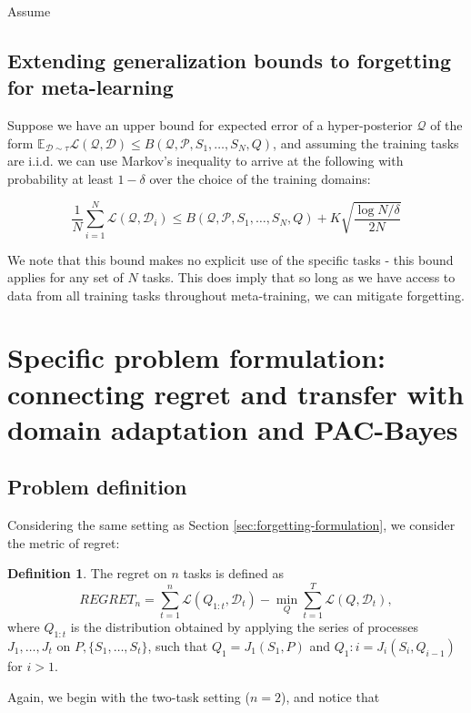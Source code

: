 \documentclass[letterpaper]{article}
\theoremstyle{definition}
\newtheorem{defn}{Definition}[section]
\begin{document}
Assume 

\subsection{Extending generalization bounds to forgetting for meta-learning}

Suppose we have an upper bound for expected error of a hyper-posterior $\mathcal{Q}$ of the form $\mathbb{E}_{\mathcal{D}\sim \tau}\mathcal{L}(\mathcal{Q}, \mathcal{D})\leq B(\mathcal{Q},\mathcal{P}, S_1,\ldots, S_N, Q)$, and assuming the training tasks are i.\!i.\!d. we can use Markov's inequality to arrive at the following with probability at least $1-\delta$ over the choice of the training domains:

\begin{equation}
\frac{1}{N}\sum_{i=1}^{N}\mathcal{L}(\mathcal{Q}, \mathcal{D}_i) \leq B(\mathcal{Q},\mathcal{P}, S_1,\ldots, S_N, Q) + K\sqrt{\frac{\log N/\delta}{2N}}
\end{equation}

We note that this bound makes no explicit use of the specific tasks - this bound applies for any set of $N$ tasks. This does imply that so long as we have access to data from all training tasks throughout meta-training, we can mitigate forgetting.

\section{Specific problem formulation: connecting regret and transfer with domain adaptation and PAC-Bayes}

\subsection{Problem definition} \label{sec:regret-formulation}

Considering the same setting as Section \ref{sec:forgetting-formulation}, we consider the metric of regret:

\begin{defn}
	The regret on $n$ tasks is defined as 
	$$REGRET_n = \sum_{t=1}^{n}\mathcal{L}(Q_{1:t}, \mathcal{D}_t)-\min_{Q} \sum_{t=1}^{T}\mathcal{L}(Q, \mathcal{D}_t),$$
	where $Q_{1:t}$ is the distribution obtained by applying the series of processes $J_1, \ldots, J_t$ on $P, \{S_1,\ldots,S_t\}$, such that $Q_1=J_1(S_1,P)$ and $Q_1:i=J_i(S_i, Q_{i-1})$ for $i>1$.
\end{defn}

Again, we begin with the two-task setting ($n=2$), and notice that
\end{document}
